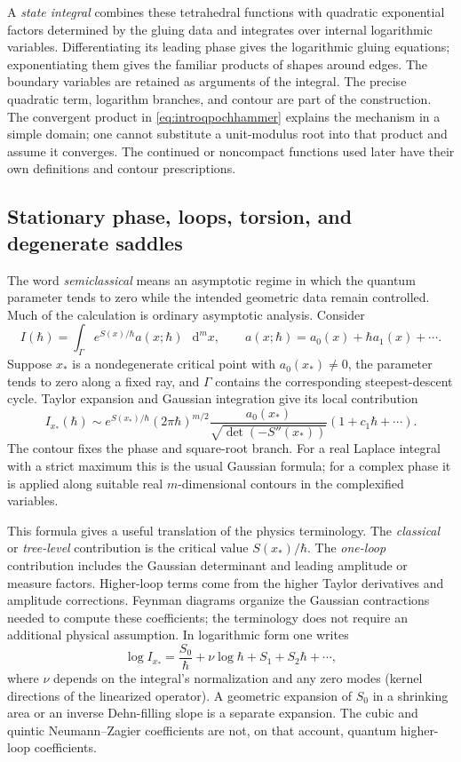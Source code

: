 \documentclass[11pt,a4paper]{article}
\numberwithin{equation}{section}
\theoremstyle{definition}
\theoremstyle{remark}
\newcommand{\dd}{\mathop{}\!\mathrm d}
\begin{document}
A \emph{state integral} combines these tetrahedral functions with
quadratic exponential factors determined by the gluing data and
integrates over internal logarithmic variables. Differentiating its
leading phase gives the logarithmic gluing equations; exponentiating
them gives the familiar products of shapes around edges. The
boundary variables are retained as arguments of the integral.
The precise quadratic term, logarithm branches, and contour are
part of the construction. The convergent product in
\eqref{eq:introqpochhammer} explains the mechanism in a simple
domain; one cannot substitute a unit-modulus root into that product
and assume it converges. The continued or noncompact functions used
later have their own definitions and contour prescriptions.
\subsection{Stationary phase, loops, torsion, and degenerate saddles}
\label{sec:introsemiclassical}

The word \emph{semiclassical} means an asymptotic regime in which
the quantum parameter tends to zero while the intended geometric
data remain controlled. Much of the calculation is ordinary
asymptotic analysis. Consider
\begin{equation}
 I(\hbar)=\int_\Gamma e^{S(x)/\hbar}
                 a(x;\hbar)\,\dd^m x,
 \qquad a(x;\hbar)=a_0(x)+\hbar a_1(x)+\cdots.
 \label{eq:introsaddleintegral}
\end{equation}
Suppose $x_*$ is a nondegenerate critical point with $a_0(x_*)\ne0$,
the parameter tends
to zero along a fixed ray, and $\Gamma$ contains the corresponding
steepest-descent cycle. Taylor expansion and Gaussian integration
give its local contribution
\begin{equation}
 I_{x_*}(\hbar)\sim
 e^{S(x_*)/\hbar}(2\pi\hbar)^{m/2}
 \frac{a_0(x_*)}{\sqrt{\det(-S''(x_*))}}
 (1+c_1\hbar+\cdots).
 \label{eq:introgaussian}
\end{equation}
The contour fixes the phase and square-root branch. For a real
Laplace integral with a strict maximum this is the usual Gaussian
formula; for a complex phase it is applied along suitable real
$m$-dimensional contours in the complexified variables.

This formula gives a useful translation of the physics terminology.
The \emph{classical} or \emph{tree-level} contribution is the
critical value $S(x_*)/\hbar$. The \emph{one-loop} contribution
includes the Gaussian determinant and leading amplitude or measure
factors. Higher-loop terms come from the higher Taylor derivatives
and amplitude corrections. Feynman diagrams organize the Gaussian
contractions needed to compute these coefficients; the terminology
does not require an additional physical assumption. In logarithmic
form one writes
\[
 \log I_{x_*}=\frac{S_0}{\hbar}
      +\nu\log\hbar+S_1+S_2\hbar+\cdots,
\]
where $\nu$ depends on the integral's normalization and any zero
modes (kernel directions of the linearized operator). A geometric expansion of $S_0$ in a shrinking area or an
inverse Dehn-filling slope is a separate expansion. The cubic and
quintic Neumann--Zagier coefficients are not, on that account,
quantum higher-loop coefficients.
\end{document}
